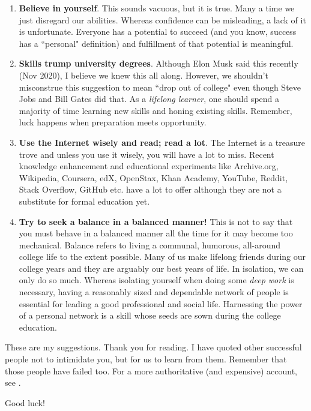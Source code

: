 \documentclass[a6paper]{article}
\begin{document}
\begin{enumerate}
    \item \textbf{Believe in yourself}. This sounds vacuous, but it is true. Many a time we just disregard our abilities. Whereas confidence can be misleading, a lack of it is unfortunate. Everyone has a potential to succeed (and you know, success has a ``personal" definition) and fulfillment of that potential is meaningful. 
    \item \textbf{Skills trump university degrees}. Although Elon Musk said this recently (Nov 2020), I believe we knew this all along. However, we shouldn't misconstrue this suggestion to mean ``drop out of college" even though Steve Jobs and Bill Gates did that. As a \emph{lifelong learner}, one should spend a majority of time learning new skills and honing existing skills. Remember, luck happens when preparation meets opportunity.
    \item \textbf{Use the Internet wisely and read; read a lot}. The Internet is a treasure trove and unless you use it wisely, you will have a lot to miss. Recent knowledge enhancement and educational experiments like Archive.org, Wikipedia, Coursera, edX, OpenStax, Khan Academy, YouTube, Reddit, Stack Overflow, GitHub etc. have a lot to offer although they are not a substitute for formal education yet.
    \item \textbf{Try to seek a balance in a balanced manner!} This is not to say that you must behave in a balanced manner all the time for it may become too mechanical. Balance refers to living a communal, humorous, all-around college life to the extent possible. Many of us make lifelong friends during our college years and they are arguably our best years of life. In isolation, we can only do so much. Whereas isolating yourself when doing some \emph{deep work} is necessary, having a reasonably sized and dependable network of people is essential for leading a good professional and social life. Harnessing the power of a personal network is a skill whose seeds are sown during the college education.
\end{enumerate}

These are my suggestions. Thank you for reading. I have quoted other successful people not to intimidate you, but for us to learn from them. Remember that those people have failed too. For a more authoritative (and expensive) account, see \cite{ken-bain}. 

Good luck!
\end{document}
